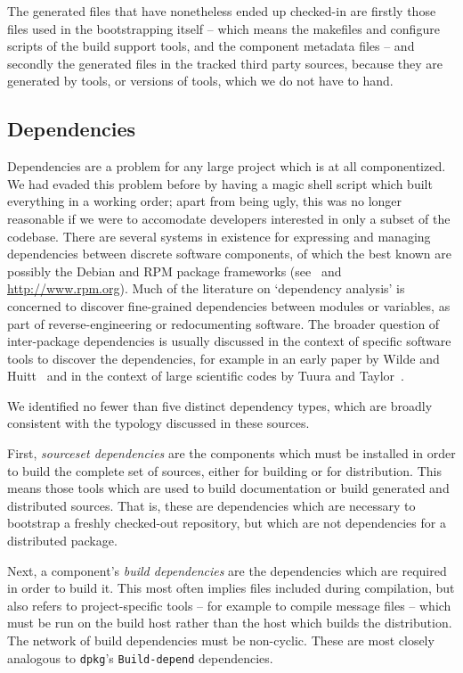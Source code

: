 \documentclass{speauth}
\begin{document}
The generated files that have nonetheless ended up checked-in are
firstly those files used in the bootstrapping itself -- which means
the makefiles and configure scripts of the build support tools, and
the component metadata files -- and secondly the generated files in
the tracked third party sources, because they are generated by tools,
or versions of tools, which we do not have to hand.

\subsection{Dependencies}
\label{s:deps}

Dependencies are a problem for any large project which is at all
componentized.  We had evaded this problem before by having a magic
shell script which built everything in a working order; apart from
being ugly, this was no longer reasonable if we were to accomodate
developers interested in only a subset of the codebase.  There are
several systems in existence for expressing and managing dependencies
between discrete software components, of which the best known are
possibly the Debian and RPM package frameworks
(see~\cite[ch~7]{debian05} and \url{http://www.rpm.org}).  Much of the
literature on `dependency analysis' is concerned to discover
fine-grained dependencies between modules or variables, as part of
reverse-engineering or redocumenting software.  The broader question of
inter-package dependencies is usually discussed in the context of
specific software tools to discover the dependencies, for example in
an early paper by Wilde and Huitt~\cite{wilde91} and in the context of
large scientific codes by Tuura and Taylor~\cite{tuura01}.

We identified no fewer than five distinct dependency types, which are
broadly consistent with the typology discussed in these sources.

First, \emph{sourceset dependencies} are the components which must be
installed in order to build the complete set of sources, either for
building or for distribution.  This means those tools which are used
to build documentation or build generated and distributed sources.
That is, these are dependencies which are necessary to bootstrap a
freshly checked-out repository, but which are not dependencies for a
distributed package.

Next, a component's \emph{build dependencies} are the dependencies
which are required in order to build it.  This most often implies
files included during compilation, but also refers to project-specific
tools -- for example to compile message files -- which must be run on
the build host rather than the host which builds the distribution.
The network of build dependencies must be non-cyclic.  These are most
closely analogous to \texttt{dpkg}'s \texttt{Build-depend} dependencies.
\end{document}
